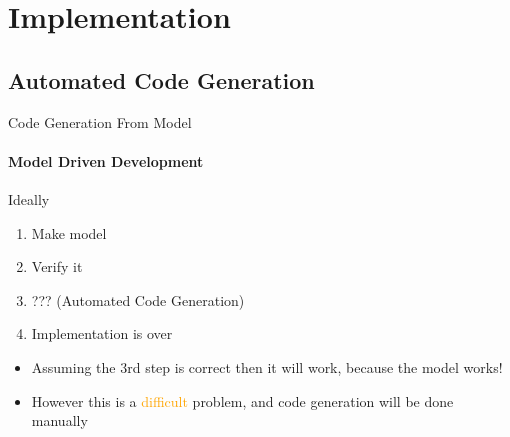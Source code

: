 \section{Implementation}
    \subsection{Automated Code Generation}
    \begin{frame}[t]{Code Generation From Model}\framesubtitle{Model Driven Development}
        Ideally
        \begin{enumerate}
            \item Make model
            \item Verify it
            \item ??? (Automated Code Generation)
            \item Implementation is over
        \end{enumerate}
        \bigskip
        \begin{itemize}
            \item <2->Assuming the 3rd step is correct then it will work, because the model works!
            \item <3->However this is a \textcolor{orange}{difficult} problem, and code generation will be done manually 
        \end{itemize}
    \end{frame}
